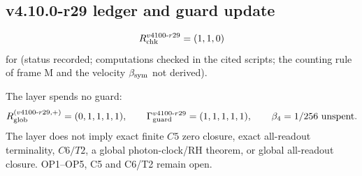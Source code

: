 \subsection*{v4.10.0-r29 ledger and guard update}
\label{subsec:v4100-r29-ledger-guard}

\[
R_{\rm chk}^{v4100\text{-}r29}=(1,1,0)
\]
for (status recorded; computations checked in the cited scripts; the counting rule of frame M and the velocity \(\beta_{\rm sym}\) not derived).

The layer spends no guard:
\[
R_{\rm glob}^{(v4100\text{-}r29,+)}=(0,1,1,1,1),
\qquad
\Gamma_{\rm guard}^{v4100\text{-}r29}=(1,1,1,1,1),
\qquad
\beta_4=1/256\ \text{unspent}.
\]
The layer does not imply exact finite \(C5\) zero closure, exact all-readout terminality, \(C6/T2\), a global photon-clock/RH theorem,
or global all-readout closure.  OP1--OP5, C5 and C6/T2 remain open.
